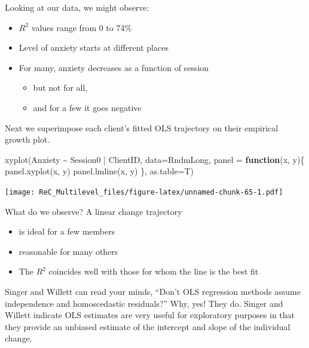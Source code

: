 \documentclass[
  11pt,
]{book}
\newenvironment{Shaded}{\begin{snugshade}}{\end{snugshade}}
\newcommand{\AttributeTok}[1]{\textcolor[rgb]{0.77,0.63,0.00}{#1}}
\newcommand{\ControlFlowTok}[1]{\textcolor[rgb]{0.13,0.29,0.53}{\textbf{#1}}}
\newcommand{\FunctionTok}[1]{\textcolor[rgb]{0.00,0.00,0.00}{#1}}
\newcommand{\NormalTok}[1]{#1}
\newcommand{\SpecialCharTok}[1]{\textcolor[rgb]{0.00,0.00,0.00}{#1}}
\providecommand{\tightlist}{%
  \setlength{\itemsep}{0pt}\setlength{\parskip}{0pt}}
\begin{document}
Looking at our data, we might observe:

\begin{itemize}
\tightlist
\item
  \(R^2\) values range from 0 to 74\%
\item
  Level of anxiety starts at different places
\item
  For many, anxiety decreases as a function of session

  \begin{itemize}
  \tightlist
  \item
    but not for all,
  \item
    and for a few it goes negative
  \end{itemize}
\end{itemize}

Next we superimpose each client's fitted OLS trajectory on their empirical growth plot.

\begin{Shaded}
\begin{Highlighting}[]
\FunctionTok{xyplot}\NormalTok{(Anxiety }\SpecialCharTok{\textasciitilde{}}\NormalTok{ Session0 }\SpecialCharTok{|}\NormalTok{ ClientID, }\AttributeTok{data=}\NormalTok{RndmLong,}
  \AttributeTok{panel =} \ControlFlowTok{function}\NormalTok{(x, y)\{}
    \FunctionTok{panel.xyplot}\NormalTok{(x, y)}
    \FunctionTok{panel.lmline}\NormalTok{(x, y)}
\NormalTok{  \},  }\AttributeTok{as.table=}\NormalTok{T)}
\end{Highlighting}
\end{Shaded}

\texttt{[image: ReC\_Multilevel\_files/figure-latex/unnamed-chunk-65-1.pdf]}

What do we observe? A linear change trajectory

\begin{itemize}
\tightlist
\item
  is ideal for a few members
\item
  reasonable for many others
\item
  The \(R^2\) coincides well with those for whom the line is the best fit
\end{itemize}

Singer and Willett \citeyearpar{singer_applied_2003} can read your minds, ``Don't OLS regression methods assume independence and homoscedastic residuals?'' Why, yes! They do. Singer and Willett indicate OLS estimates are very useful for exploratory purposes in that they provide an unbiased estimate of the intercept and slope of the individual change.
\end{document}
